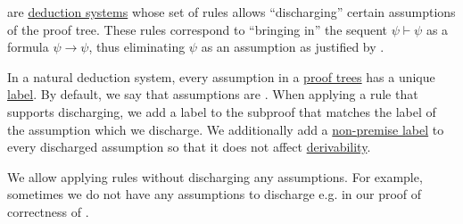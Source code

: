 \begin{definition}\label{def:propositional_natural_deduction_system}
   are \hyperref[def:deduction_system]{deduction systems} whose set of rules allows \enquote{discharging} certain assumptions of the proof tree. These rules correspond to \enquote{bringing in} the sequent \( \psi \vdash \psi \) as a formula \( \psi \to \psi \), thus eliminating \( \psi \) as an assumption as justified by .

  In a natural deduction system, every assumption in a \hyperref[def:natural_deduction_proof_tree]{proof trees} has a unique \hyperref[def:labeled_set]{label}. By default, we say that assumptions are . When applying a rule that supports discharging, we add a label to the subproof that matches the label of the assumption which we discharge. We additionally add a \hyperref[def:natural_deduction_proof_tree/premises]{non-premise label} to every discharged assumption so that it does not affect \hyperref[def:proof_derivability]{derivability}.

  We allow applying rules without discharging any assumptions. For example, sometimes we do not have any assumptions to discharge e.g. in our proof of correctness of .
\end{definition}

